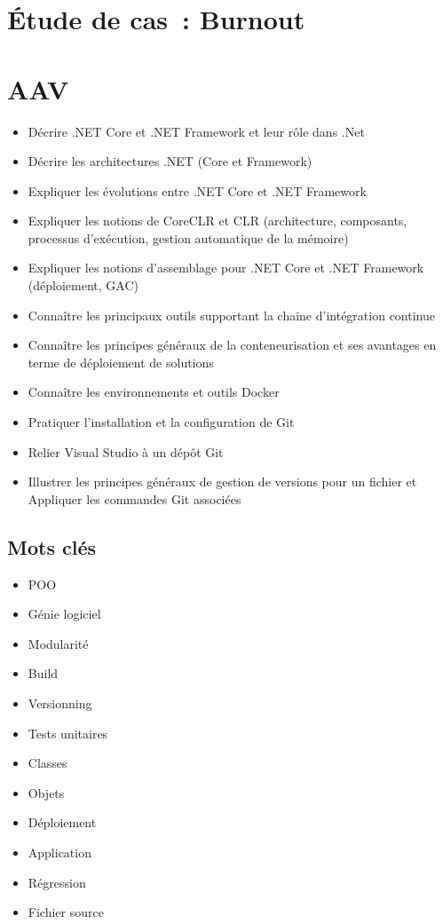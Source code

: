 \newpage
\section*{Étude de cas~: Burnout}

\section*{AAV}
\begin{itemize}
	\item [1] Décrire .NET Core et .NET Framework et leur rôle dans .Net
	\item [1] Décrire les architectures .NET (Core et Framework)
	\item [2] Expliquer les évolutions entre .NET Core et .NET Framework
	\item [2] Expliquer les notions de CoreCLR et CLR (architecture, composants, processus d'exécution, gestion automatique de la mémoire)
	\item [2] Expliquer les notions d'assemblage pour .NET Core et .NET Framework (déploiement, GAC)
	\item [1] Connaître les principaux outils supportant la chaine d'intégration continue
	\item [1] Connaître les principes généraux de la conteneurisation et ses avantages en terme de déploiement de solutions
	\item [1] Connaître les environnements et outils Docker
	\item [3] Pratiquer l'installation et la configuration de Git
	\item [3] Relier Visual Studio à un dépôt Git
	\item [3] Illustrer les principes généraux de gestion de versions pour un fichier et Appliquer les commandes Git associées
\end{itemize}

\newpage

\subsection*{Mots clés}
{}
\begin{itemize}
	\item POO
	\item Génie logiciel
	\item Modularité
	\item Build
	\item Versionning
	\item Tests unitaires
	\item Classes
	\item Objets
	\item Déploiement
	\item Application
	\item Régression
	\item Fichier source
\end{itemize}

